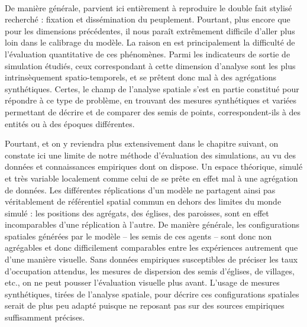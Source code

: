 \bigskip

\paragraph[Conclusion intermédiaire]{}
De manière générale, \simfeodal{} parvient ici entièrement à reproduire le double fait stylisé recherché : fixation et dissémination du peuplement.
Pourtant, plus encore que pour les dimensions précédentes, il nous paraît extrêmement difficile d'aller plus loin dans le calibrage du modèle.
La raison en est principalement la difficulté de l'évaluation quantitative de ces phénomènes.
Parmi les indicateurs de sortie de simulation étudiés, ceux correspondant à cette dimension d'analyse sont les plus intrinsèquement spatio-temporels, et se prêtent donc mal à des agrégations synthétiques.
Certes, le champ de l'analyse spatiale s'est en partie constitué pour répondre à ce type de problème, en trouvant des mesures synthétiques et variées permettant de décrire et de comparer des semis de points, correspondent-ils à des entités ou à des époques différentes.

Pourtant, et on y reviendra plus extensivement dans le chapitre suivant, on constate ici une limite de notre méthode d'évaluation des simulations, au vu des données et connaissances empiriques dont on dispose.
Un espace théorique, simulé et très variable localement comme celui de \simfeodal{} se prête en effet mal à une agrégation de données.
Les différentes réplications d'un modèle ne partagent ainsi pas véritablement de référentiel spatial commun en dehors des limites du monde simulé : les positions des agrégats, des églises, des paroisses, sont en effet incomparables d'une réplication à l'autre.
De manière générale, les configurations spatiales générées par le modèle -- les semis de ces agents -- sont donc non agrégables et donc difficilement comparables entre les expériences autrement que d'une manière visuelle.
Sans données empiriques susceptibles de préciser les taux d'occupation attendus, les mesures de dispersion des semis d'églises, de villages, etc., on ne peut pousser l'évaluation visuelle plus avant.
L'usage de mesures synthétiques, tirées de l'analyse spatiale, pour décrire ces configurations spatiales serait de plus peu adapté puisque ne reposant pas sur des sources empiriques suffisamment précises.


